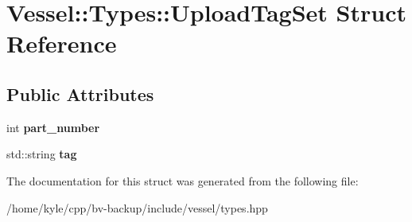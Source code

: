 \hypertarget{struct_vessel_1_1_types_1_1_upload_tag_set}{}\section{Vessel\+:\+:Types\+:\+:Upload\+Tag\+Set Struct Reference}
\label{struct_vessel_1_1_types_1_1_upload_tag_set}
\subsection*{Public Attributes}
\begin{DoxyCompactItemize}
\item 
\mbox{\label{struct_vessel_1_1_types_1_1_upload_tag_set_a3fd14cdd1f64bd9e6fee9a8cc85ffab9}} 
int {\bfseries part\+\_\+number}
\item 
\mbox{\label{struct_vessel_1_1_types_1_1_upload_tag_set_a5409400aff1c66c0ed4f1d39d4538bbf}} 
std\+::string {\bfseries tag}
\end{DoxyCompactItemize}


The documentation for this struct was generated from the following file\+:\begin{DoxyCompactItemize}
\item 
/home/kyle/cpp/bv-\/backup/include/vessel/types.\+hpp\end{DoxyCompactItemize}
